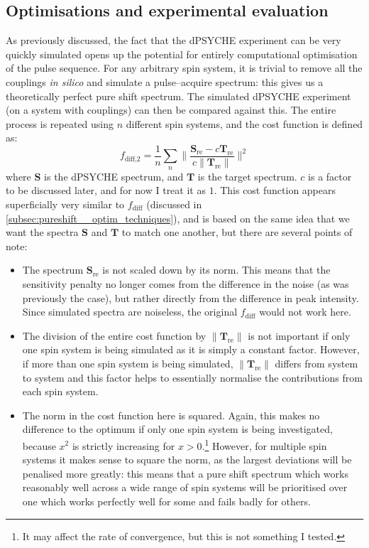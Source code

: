 \subsection{Optimisations and experimental evaluation}
\label{subsec:pureshift__dpsyche_optimisation}

As previously discussed, the fact that the dPSYCHE experiment can be very quickly simulated opens up the potential for entirely computational optimisation of the pulse sequence.
For any arbitrary spin system, it is trivial to remove all the couplings \textit{in silico} and simulate a pulse--acquire spectrum: this gives us a theoretically perfect pure shift spectrum.
The simulated dPSYCHE experiment (on a system with couplings) can then be compared against this.
The entire process is repeated using $n$ different spin systems, and the cost function is defined as:
\begin{equation}
    \label{eq:f_diff_dpsyche}
    f_\text{diff,2} = \frac{1}{n}\sum_n \Biggl\lVert \frac{\symbf{S}_\text{re} - c\symbf{T}_\text{re}}{c\lVert \symbf{T}_\text{re} \rVert} \Biggr\rVert^2
\end{equation}
where $\symbf{S}$ is the dPSYCHE spectrum, and $\symbf{T}$ is the target spectrum.
$c$ is a factor to be discussed later, and for now I treat it as $1$.
This cost function appears superficially very similar to $f_\text{diff}$ (discussed in \cref{subsec:pureshift__optim_techniques}), and is based on the same idea that we want the spectra $\symbf{S}$ and $\symbf{T}$ to match one another, but there are several points of note:
\begin{itemize}
    \item The spectrum $\symbf{S}_\text{re}$ is not scaled down by its norm. This means that the sensitivity penalty no longer comes from the difference in the noise (as was previously the case), but rather directly from the difference in peak intensity.
        Since simulated spectra are noiseless, the original $f_\text{diff}$ would not work here.
    \item The division of the entire cost function by $\lVert\symbf{T}_\text{re}\rVert$ is not important if only one spin system is being simulated as it is simply a constant factor.
        However, if more than one spin system is being simulated, $\lVert\symbf{T}_\text{re}\rVert$ differs from system to system and this factor helps to essentially normalise the contributions from each spin system.
    \item The norm in the cost function here is squared.
        Again, this makes no difference to the optimum if only one spin system is being investigated, because $x^2$ is strictly increasing for $x > 0$.\footnote{It may affect the rate of convergence, but this is not something I tested.}
        However, for multiple spin systems it makes sense to square the norm, as the largest deviations will be penalised more greatly: this means that a pure shift spectrum which works reasonably well across a wide range of spin systems will be prioritised over one which works perfectly well for some and fails badly for others.
\end{itemize}

